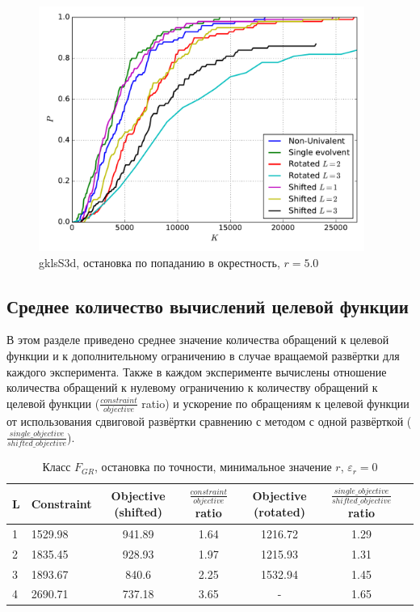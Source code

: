 \documentclass[a4paper]{article}
\begin{document}
\begin{figure}[H]
  \center
  \includegraphics[width=0.95\textwidth]{../gklsS3d/same_r/opt_point/gklsS3d_same_r_opt_pt_op.pdf}
  \caption{gklsS3d, остановка по попаданию в окрестность, $r=5.0$}
  \label{fig:}
\end{figure}

\subsection{Среднее количество вычислений целевой функции}
В этом разделе приведено среднее значение количества обращений к целевой функции и к дополнительному ограничению в случае
вращаемой развёртки для каждого эксперимента. Также в каждом эксперименте вычислены отношение
количества обращений к нулевому ограничению к количеству обращений к целевой функции ($\frac{constraint}{objective}$ ratio) и
ускорение по обращениям к целевой функции от использования сдвиговой развёртки сравнению с методом с одной развёрткой ($\frac{single\_objective}{shifted\_objective}$).

\begin{table}[H]
\begin{center}
\caption{Класс $F_{GR}$, остановка по точности, минимальное значение $r$, $\varepsilon_r=0$}
  \begin{tabular}{l|l*{5}{c}}
  L & Constraint & Objective (shifted) & $\frac{constraint}{objective}$ ratio & Objective (rotated) & $\frac{single\_objective}{shifted\_objective}$ ratio \\
  \hline
  1 & 1529.98 & 941.89 & 1.64 & 1216.72 & 1.29 \\
  2 & 1835.45 & 928.93 & 1.97 & 1215.93 & 1.31 \\
  3 & 1893.67 & 840.6  & 2.25 & 1532.94 & 1.45 \\
  4 & 2690.71 & 737.18 & 3.65 &  - & 1.65 \\
  \end{tabular}
\end{center}
\end{table}
\end{document}
